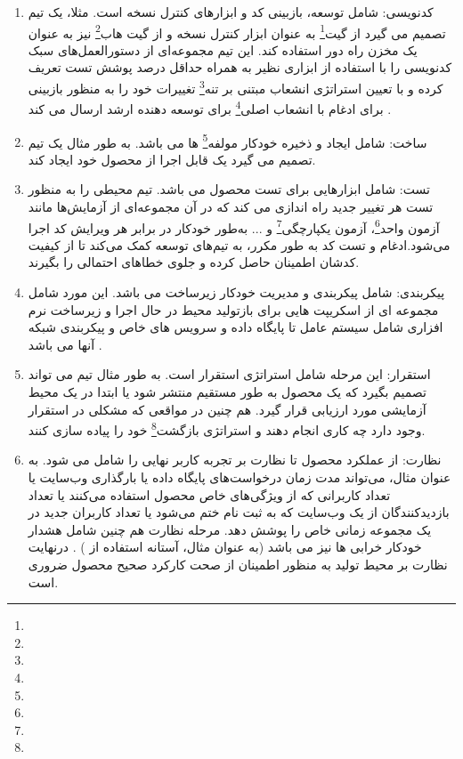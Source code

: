 \begin{enumerate}
	\item
کدنویسی: شامل توسعه، بازبینی کد و ابزارهای کنترل نسخه است. مثلا، یک تیم تصمیم می گیرد از گیت\footnote{} به عنوان ابزار کنترل نسخه و از گیت هاب\footnote{} نیز به عنوان یک مخزن راه دور استفاده کند. این تیم مجموعه‌ای از دستورالعمل‌های سبک کدنویسی را با استفاده از ابزاری نظیر  به همراه حداقل درصد پوشش تست تعریف کرده و با تعیین استراتژی انشعاب مبتنی بر تنه\footnote{} تغییرات خود را به منظور بازبینی برای ادغام با انشعاب اصلی\footnote{} برای توسعه دهنده ارشد ارسال می کند \cite{Devopstrunk}.
	\item 
ساخت: شامل ایجاد و ذخیره خودکار مولفه\footnote{} ها می باشد. به طور مثال یک تیم تصمیم می گیرد یک  قابل اجرا از محصول خود ایجاد کند.
	\item 
تست: شامل ابزارهایی برای تست محصول می باشد. تیم محیطی را به منظور تست هر تغییر جدید راه اندازی می کند که در آن مجموعه‌ای از آزمایش‌ها مانند آزمون واحد\footnote{}، آزمون یکپارچگی\footnote{} و ... به‌طور خودکار در برابر هر ویرایش کد اجرا می‌شود.ادغام و تست کد به طور مکرر، به تیم‌های توسعه کمک می‌کند تا از کیفیت کدشان اطمینان حاصل کرده و جلوی خطاهای احتمالی را بگیرند.
	\item 
	پیکربندی: شامل پیکربندی و مدیریت خودکار زیرساخت می باشد. این مورد شامل مجموعه ای از اسکریپت هایی برای بازتولید محیط در حال اجرا و زیرساخت نرم افزاری شامل سیستم عامل تا پایگاه داده و سرویس های خاص و پیکربندی شبکه آنها می باشد \cite{DevopsIaac1, DevopsIaac2}.
	\item 
استقرار: این مرحله شامل استراتژی استقرار است. به طور مثال تیم می تواند تصمیم بگیرد که یک محصول به طور مستقیم منتشر شود یا ابتدا در یک محیط آزمایشی مورد ارزیابی قرار گیرد. هم چنین در مواقعی که مشکلی در استقرار وجود دارد چه کاری انجام دهند و استراتژی بازگشت\footnote{} خود را پیاده سازی کنند.
	\item 
نظارت: از عملکرد محصول تا نظارت بر تجربه کاربر نهایی را شامل می شود. به عنوان مثال، می‌تواند مدت زمان درخواست‌های پایگاه داده یا بارگذاری وب‌سایت یا تعداد کاربرانی که از ویژگی‌های خاص محصول استفاده می‌کنند یا تعداد بازدیدکنندگان از یک وب‌سایت که به ثبت نام ختم می‌شود یا تعداد کاربران جدید در یک مجموعه زمانی خاص را پوشش دهد. مرحله نظارت هم چنین شامل هشدار خودکار خرابی ها نیز می باشد (به عنوان مثال، آستانه استفاده از ) \cite{DevopsMonitor}. درنهایت نظارت بر محیط تولید به منظور اطمینان از صحت کارکرد صحیح محصول ضروری است.
\end{enumerate}

